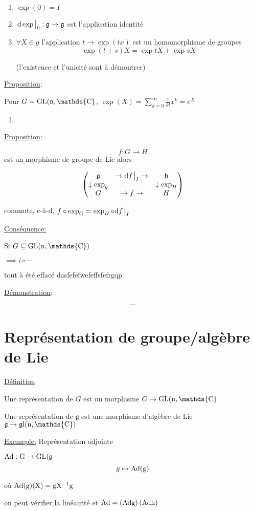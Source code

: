 \begin{enumerate}
	\item \(\exp(0) = I\)
	\item \(\eval{\dd \exp}_{0} : \mathfrak{g} \to \mathfrak{g} \) est l'application identité
	\item \(\forall X \in g\) l'application \(t \to \exp(tx)\) est un homomorphisme de groupes 
		\[ \exp(t+s) X = \exp tX + \exp sX  \]

		(l'existence et l'unicité sont à démontrer)
\end{enumerate}

\underline{Proposition}:

Pour \(G = \rm{GL}(n, \mathds{C} \), \(\exp(X) = \sum_{k=0}^{\infty} \frac{1}{k!} x^{k}= e^{X}\)

\begin{tcolorbox}[title=Rappels sur l'exponentiation de matrices]
	\begin{enumerate}
		\item 
	\end{enumerate}
	 
\end{tcolorbox}

\underline{Proposition}:

\[ f: G \to H \] est un morphisme de groupe de Lie alors 

\[ \begin{pmatrix} \mathfrak{g} & \to \dd f \eval_I \to & \mathfrak{h} \\ \downarrow \exp_g & & \downarrow\exp_H \\ G & \to f \to & H \end{pmatrix}  \]

commute, c-à-d, \(f \circ \exp_G = \exp_H \circ \dd f \eval_I \)

\underline{Conséquence:}

Si \(G \subseteq \rm{GL}(n, \mathds{C})\)


\(\implies i \circ \dotsb \)


tout à été effacé  dasfefefwefeffsfefrgqp

\underline{Démonstration}:

\[ \dotsb \]

\section*{Représentation de groupe/algèbre de Lie} 

\underline{Définition} 

Une représentation de \(G\) est un morphisme \(G \to \rm{GL}(n, \mathds{C}\)

Une représentation de \(\mathfrak{g}\) est une morphisme d'algèbre de Lie \( \mathfrak{g} \to \mathfrak{g}\rm{l}(n, \mathds{C})\)


\underline{Exemeple:} Représentation adjointe 


\(\rm{Ad}: G \to \rm{GL}(\mathfrak{g}\)
\[ g \mapsto \rm{Ad}(g) \]

où \(\rm{Ad}(g) (X) = g X ^{-1} g\)

on peut vérifier la linéairité et \(\rm{Ad} = \left( \rm{Ad} g\right) \left( \rm{Ad} h \right)  \)




